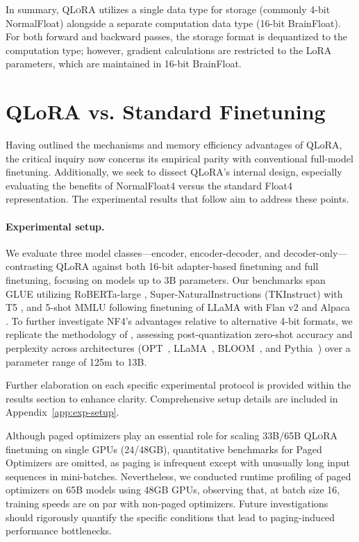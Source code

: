 In summary, \textsc{QLoRA} utilizes a single data type for storage (commonly 4-bit NormalFloat) alongside a separate computation data type (16-bit BrainFloat). For both forward and backward passes, the storage format is dequantized to the computation type; however, gradient calculations are restricted to the LoRA parameters, which are maintained in 16-bit BrainFloat.

\section{QLoRA vs. Standard Finetuning}
\label{sec:comp_to_std}

Having outlined the mechanisms and memory efficiency advantages of QLoRA, the critical inquiry now concerns its empirical parity with conventional full-model finetuning. Additionally, we seek to dissect QLoRA's internal design, especially evaluating the benefits of NormalFloat4 versus the standard Float4 representation. The experimental results that follow aim to address these points.

\paragraph{Experimental setup.} We evaluate three model classes—encoder, encoder-decoder, and decoder-only—contrasting QLoRA against both 16-bit adapter-based finetuning and full finetuning, focusing on models up to 3B parameters. Our benchmarks span GLUE \citep{wang2018glue} utilizing RoBERTa-large \citep{liu2019roberta}, Super-NaturalInstructions (TKInstruct) \citep{wang2022super} with T5 \citep{t5}, and 5-shot MMLU \citep{hendrycksmeasuring} following finetuning of LLaMA with Flan v2 \citep{longpre2023flan} and Alpaca \citep{alpaca}. To further investigate NF4’s advantages relative to alternative 4-bit formats, we replicate the methodology of \citet{dettmers2022case}, assessing post-quantization zero-shot accuracy and perplexity across architectures (OPT~\citep{zhang2022opt}, LLaMA~\citep{touvron2023llama}, BLOOM~\citep{scao2022bloom}, and Pythia~\citep{biderman2023pythia}) over a parameter range of 125m to 13B.

Further elaboration on each specific experimental protocol is provided within the results section to enhance clarity. Comprehensive setup details are included in Appendix~\ref{app:exp-setup}.

Although paged optimizers play an essential role for scaling 33B/65B \textsc{QLoRA} finetuning on single GPUs (24/48GB), quantitative benchmarks for Paged Optimizers are omitted, as paging is infrequent except with unusually long input sequences in mini-batches. Nevertheless, we conducted runtime profiling of paged optimizers on 65B models using 48GB GPUs, observing that, at batch size 16, training speeds are on par with non-paged optimizers. Future investigations should rigorously quantify the specific conditions that lead to paging-induced performance bottlenecks.

